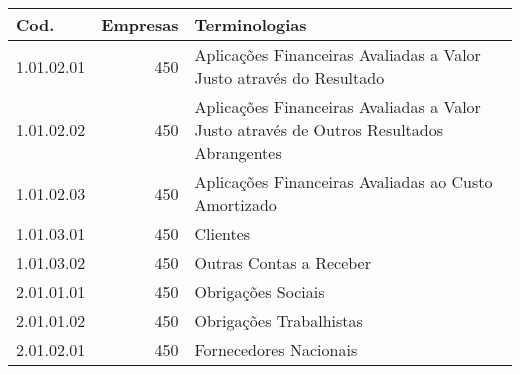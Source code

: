 \begin{table}[ht]
\centering
\begin{tabular}{lrl}
  \hline
Cod. & Empresas & Terminologias \\ 
  \hline
1.01.02.01 & 450 & Aplicações Financeiras Avaliadas a Valor Justo através do Resultado \\ 
  1.01.02.02 & 450 & Aplicações Financeiras Avaliadas a Valor Justo através de Outros Resultados Abrangentes \\ 
  1.01.02.03 & 450 & Aplicações Financeiras Avaliadas ao Custo Amortizado \\ 
  1.01.03.01 & 450 & Clientes \\ 
  1.01.03.02 & 450 & Outras Contas a Receber \\ 
  2.01.01.01 & 450 & Obrigações Sociais \\ 
  2.01.01.02 & 450 & Obrigações Trabalhistas \\ 
  2.01.02.01 & 450 & Fornecedores Nacionais \\ 
   \hline
\end{tabular}
\end{table}
